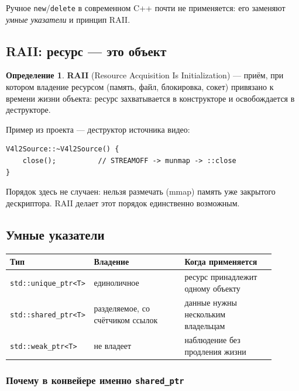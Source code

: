 \documentclass[11pt,a4paper]{article}
\theoremstyle{definition}
\newtheorem{definition}{Определение}[section]
\theoremstyle{remark}
\begin{document}
Ручное \texttt{new}/\texttt{delete} в современном C++ почти не применяется:
его заменяют \emph{умные указатели} и принцип RAII.

\subsection{RAII: ресурс --- это объект}

\begin{definition}
\textbf{RAII} (Resource Acquisition Is Initialization) --- приём, при котором
владение ресурсом (память, файл, блокировка, сокет) привязано к времени жизни
объекта: ресурс захватывается в конструкторе и освобождается в деструкторе.
\end{definition}

Пример из проекта --- деструктор источника видео:

\begin{lstlisting}
V4l2Source::~V4l2Source() {
    close();          // STREAMOFF -> munmap -> ::close
}
\end{lstlisting}

Порядок здесь не случаен: нельзя размечать (mmap) память уже закрытого
дескриптора. RAII делает этот порядок единственно возможным.

\subsection{Умные указатели}

\begin{center}
\begin{tabular}{p{0.22\linewidth}p{0.34\linewidth}p{0.34\linewidth}}
\toprule
Тип & Владение & Когда применяется \\
\midrule
\texttt{std::unique\_ptr<T>} & единоличное & ресурс принадлежит одному объекту \\
\texttt{std::shared\_ptr<T>} & разделяемое, со счётчиком ссылок &
данные нужны нескольким владельцам \\
\texttt{std::weak\_ptr<T>} & не владеет & наблюдение без продления жизни \\
\bottomrule
\end{tabular}
\end{center}

\subsubsection{Почему в конвейере именно \texttt{shared\_ptr}}
\end{document}
